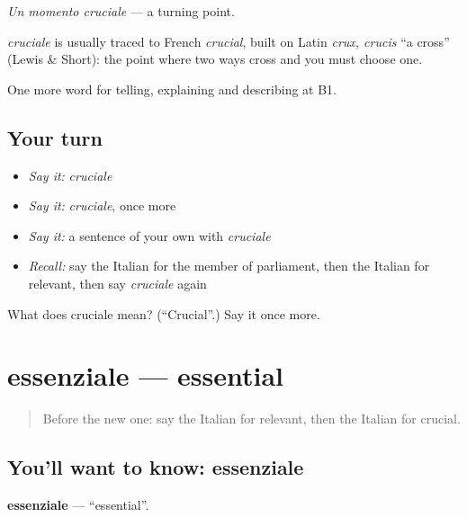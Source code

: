 \emph{Un momento cruciale} — a turning point.

\begin{cousinweb}
\emph{cruciale} is usually traced to French \emph{crucial}, built on Latin \emph{crux, crucis} \textquotedblleft{}a cross\textquotedblright{} (Lewis \& Short): the point where two ways cross and you must choose one.
\end{cousinweb}

\begin{grammarlens}[title={What you've built}]
One more word for telling, explaining and describing at B1.
\end{grammarlens}

\subsection*{Your turn}
\begin{itemize}
\raggedright
  \item \emph{Say it:} \emph{cruciale}
  \item \emph{Say it:} \emph{cruciale}, once more
  \item \emph{Say it:} a sentence of your own with \emph{cruciale}
  \item \emph{Recall:} say the Italian for the member of parliament, then the Italian for relevant, then say \emph{cruciale} again
\end{itemize}

\begin{tcolorbox}[breakable,colback=teal!4,colframe=teal!35!black,title={Before you move on}]
What does cruciale mean? (\textquotedblleft{}Crucial\textquotedblright{}.) Say it once more.
\end{tcolorbox}
\section[essenziale]{essenziale — essential}

\label{lesson:IT-C371-essenziale}



\begin{quote}
Before the new one: say the Italian for relevant, then the Italian for crucial.
\end{quote}

\subsection*{You'll want to know: essenziale}
\textbf{essenziale} — \textquotedblleft{}essential\textquotedblright{}.

